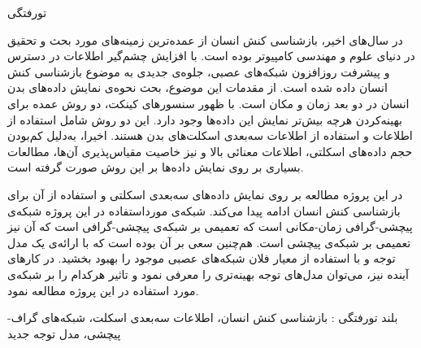 


\pagestyle{empty}

‌تورفتگی

در سال‌های اخیر، بازشناسی کنش انسان از عمده‌ترین زمینه‌های مورد بحث و تحقیق در دنیای علوم و مهندسی کامپیوتر بوده است.\cite{survey} با افزایش چشم‌گیر اطلاعات در دسترس و پیشرفت روزافزون شبکه‌های عصبی، جلوه‌ی جدیدی به موضوع بازشناسی کنش انسان داده شده است. از مقدمات این موضوع، بحث نحوه‌ی نمایش داده‌های بدن انسان در دو بعد زمان و مکان است. با ظهور سنسورهای کینکت، دو روش عمده برای بهینه‌کردن هرچه بیش‌تر نمایش این داده‌ها وجود دارد. این دو روش شامل استفاده از اطلاعات  و استفاده از اطلاعات سه‌بعدی اسکلت‌های بدن هستند.\cite{review} اخیرا، به‌دلیل کم‌بودن حجم داده‌های اسکلتی، اطلاعات معنائی بالا و نیز خاصیت مقیاس‌پذیری آن‌ها، مطالعات بسیاری بر روی نمایش داده‌ها بر این روش صورت گرفته است.

در این پروژه مطالعه بر روی نمایش داده‌های سه‌بعدی اسکلتی و استفاده از آن برای بازشناسی کنش انسان ادامه پیدا می‌کند. شبکه‌ی مورداستفاده در این پروژه شبکه‌ی پیچشی‌-گرافی زمان‌-مکانی  است که تعمیمی بر شبکه‌ی پیچشی‌-گرافی است که آن نیز تعمیمی بر شبکه‌ی پیچشی است. هم‌چنین سعی بر آن بوده است که با ارائه‌ی یک مدل توجه و با استفاده از معیار فلان شبکه‌های عصبی موجود را بهبود بخشید. در کارهای آینده نیز، می‌توان مدل‌های توجه بهینه‌تری را معرفی نمود و تاثیر هرکدام را بر شبکه‌ی مورد استفاده در این پروژه مطالعه نمود.


‌بلند
‌تورفتگی : 
بازشناسی کنش انسان، اطلاعات سه‌بعدی اسکلت، شبکه‌های گراف‌-پیچشی،‌ مدل توجه
‌جدید
